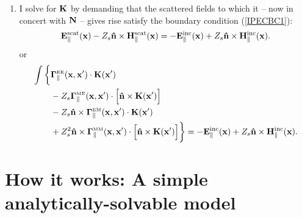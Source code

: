\documentclass{article}
\begin{document}
\begin{enumerate}
 \item I solve for $\mathbf{K}$ by demanding that the scattered fields 
       to which it -- now in concert with $\mathbf{N}$ -- gives rise 
       satisfy the boundary condition (\ref{IPECBC1}):
       $$
           \mathbf{E}_{\parallel}^{\hbox{\scriptsize{scat}}}(\mathbf{x}) 
            -Z_s \mathbf{\hat n}\times \mathbf{H}_{\parallel}^{\hbox{\scriptsize{scat}}}(\mathbf{x})
       = 
          -\mathbf{E}_{\parallel}^{\hbox{\scriptsize{inc}}}(\mathbf{x}) 
            +Z_s \mathbf{\hat n}\times \mathbf{H}_{\parallel}^{\hbox{\scriptsize{inc}}}(\mathbf{x}).
       $$
       or
       \begin{align*}
       \int\bigg\{ &\boldsymbol{\Gamma}_{\parallel}^{\hbox{\tiny{EE}}}(\mathbf{x}, \mathbf{x}^\prime) 
                   \cdot \mathbf{K}(\mathbf{x}^\prime)
                   \\
                   &- Z_s\boldsymbol{\Gamma}_{\parallel}^{\hbox{\tiny{ME}}}(\mathbf{x}, \mathbf{x}^\prime)
                   \cdot \Big[\mathbf{\hat n}\times \mathbf{K}(\mathbf{x}^\prime)\Big] 
                   \\
                   &-Z_s\mathbf{\hat n}\times \boldsymbol{\Gamma}_{\parallel}^{\hbox{\tiny{EM}}}(\mathbf{x}, \mathbf{x}^\prime) 
                   \cdot \mathbf{K}(\mathbf{x}^\prime)
                   \\
                   &+Z_s^2
                   \mathbf{\hat n}\times\boldsymbol{\Gamma}_{\parallel}^{\hbox{\tiny{MM}}}(\mathbf{x}, \mathbf{x}^\prime)
                   \cdot \Big[\mathbf{\hat n}\times \mathbf{K}(\mathbf{x}^\prime)\Big]
       \bigg\}
       = -\mathbf{E}_{\parallel}^{\hbox{\scriptsize{inc}}}(\mathbf{x}) 
            +Z_s \mathbf{\hat n}\times \mathbf{H}_{\parallel}^{\hbox{\scriptsize{inc}}}(\mathbf{x}).
       \end{align*}
\end{enumerate}

\newpage
\section{How it works: A simple analytically-solvable model}
\end{document}
